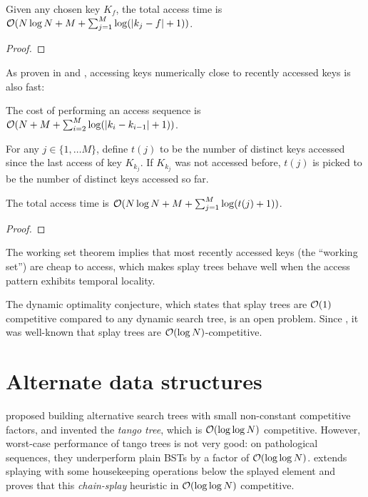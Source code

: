 \begin{theorem}
Given any chosen key $K_f$, the total access time is
$\mathcal{O}(N\log N + M + \sum_{j=1}^M \log(|k_j-f|+1))$.
\end{theorem}
\begin{proof}
\end{proof}

As proven in \cite{dynamic-finger-1} and \cite{dynamic-finger-2},
accessing keys numerically close to recently accessed keys is also fast:
\begin{theorem}
The cost of performing an access sequence is
$\mathcal{O}(N+M+\sum_{i=2}^M \log(|k_i-k_{i-1}| + 1))$.
\end{theorem}

For any $j\in\{1,\ldots M\}$, define $t(j)$ to be the number of distinct
keys accessed since the last access of key $K_{k_j}$. If $K_{k_j}$ was not
accessed before, $t(j)$ is picked to be the number of distinct keys accessed
so far.
\begin{theorem}
The total access time is $\mathcal{O}(N\log N + M + \sum_{j=1}^M\log(t(j)+1))$.
\end{theorem}
\begin{proof}
\end{proof}

The working set theorem implies that most recently accessed keys (the
``working set'') are cheap to access, which makes splay trees behave well when
the access pattern exhibits temporal locality.

The dynamic optimality conjecture, which states that splay trees are
$\mathcal{O}(1)$ competitive compared to any dynamic search tree, is an open problem.
Since \cite{splay}, it was well-known that splay trees are
$\mathcal{O}(\log N)$-competitive.

\section{Alternate data structures}
\cite{tango} proposed building alternative search trees with small
non-constant competitive factors, and invented the \emph{tango tree}, which
is $\mathcal{O}(\log\log N)$ competitive. However, worst-case performance of tango trees
is not very good: on pathological sequences, they underperform plain BSTs
by a factor of $\mathcal{O}(\log\log N)$.
\cite{chain-splaying} extends splaying with some housekeeping operations
below the splayed element and proves that this \emph{chain-splay} heuristic
in $\mathcal{O}(\log\log N)$ competitive.

